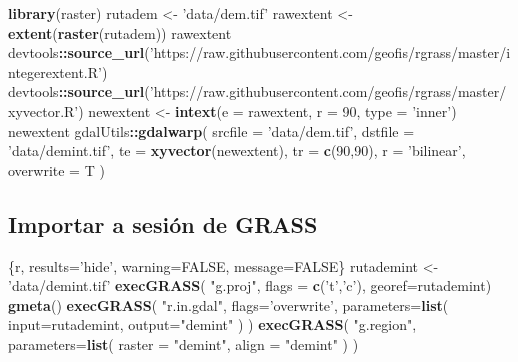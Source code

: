 \documentclass[11pt,]{article}
\newenvironment{Shaded}{\begin{snugshade}}{\end{snugshade}}
\newcommand{\KeywordTok}[1]{\textcolor[rgb]{0.13,0.29,0.53}{\textbf{#1}}}
\newcommand{\DataTypeTok}[1]{\textcolor[rgb]{0.13,0.29,0.53}{#1}}
\newcommand{\DecValTok}[1]{\textcolor[rgb]{0.00,0.00,0.81}{#1}}
\newcommand{\StringTok}[1]{\textcolor[rgb]{0.31,0.60,0.02}{#1}}
\newcommand{\OtherTok}[1]{\textcolor[rgb]{0.56,0.35,0.01}{#1}}
\newcommand{\OperatorTok}[1]{\textcolor[rgb]{0.81,0.36,0.00}{\textbf{#1}}}
\newcommand{\NormalTok}[1]{#1}
\begin{document}
\begin{Shaded}
\begin{Highlighting}[]
\KeywordTok{library}\NormalTok{(raster)}
\NormalTok{rutadem <-}\StringTok{ 'data/dem.tif'}
\NormalTok{rawextent <-}\StringTok{ }\KeywordTok{extent}\NormalTok{(}\KeywordTok{raster}\NormalTok{(rutadem))}
\NormalTok{rawextent}
\NormalTok{devtools}\OperatorTok{::}\KeywordTok{source_url}\NormalTok{(}\StringTok{'https://raw.githubusercontent.com/geofis/rgrass/master/integerextent.R'}\NormalTok{)}
\NormalTok{devtools}\OperatorTok{::}\KeywordTok{source_url}\NormalTok{(}\StringTok{'https://raw.githubusercontent.com/geofis/rgrass/master/xyvector.R'}\NormalTok{)}
\NormalTok{newextent <-}\StringTok{ }\KeywordTok{intext}\NormalTok{(}\DataTypeTok{e =}\NormalTok{ rawextent, }\DataTypeTok{r =} \DecValTok{90}\NormalTok{, }\DataTypeTok{type =} \StringTok{'inner'}\NormalTok{)}
\NormalTok{newextent}
\NormalTok{gdalUtils}\OperatorTok{::}\KeywordTok{gdalwarp}\NormalTok{(}
  \DataTypeTok{srcfile =} \StringTok{'data/dem.tif'}\NormalTok{,}
  \DataTypeTok{dstfile =} \StringTok{'data/demint.tif'}\NormalTok{,}
  \DataTypeTok{te =} \KeywordTok{xyvector}\NormalTok{(newextent),}
  \DataTypeTok{tr =} \KeywordTok{c}\NormalTok{(}\DecValTok{90}\NormalTok{,}\DecValTok{90}\NormalTok{),}
  \DataTypeTok{r =} \StringTok{'bilinear'}\NormalTok{,}
  \DataTypeTok{overwrite =}\NormalTok{ T}
\NormalTok{)}
\end{Highlighting}
\end{Shaded}

\subsection{Importar a sesión de
GRASS}\label{importar-a-sesiuxf3n-de-grass}

\begin{Shaded}
\begin{Highlighting}[]
\NormalTok{   \{r, results=}\StringTok{'hide'}\NormalTok{, warning=}\OtherTok{FALSE}\NormalTok{, message=}\OtherTok{FALSE}\NormalTok{\}}
\NormalTok{rutademint <-}\StringTok{ 'data/demint.tif'}
\KeywordTok{execGRASS}\NormalTok{(}
  \StringTok{"g.proj"}\NormalTok{,}
  \DataTypeTok{flags =} \KeywordTok{c}\NormalTok{(}\StringTok{'t'}\NormalTok{,}\StringTok{'c'}\NormalTok{),}
  \DataTypeTok{georef=}\NormalTok{rutademint)}
\KeywordTok{gmeta}\NormalTok{()}
\KeywordTok{execGRASS}\NormalTok{(}
  \StringTok{"r.in.gdal"}\NormalTok{,}
  \DataTypeTok{flags=}\StringTok{'overwrite'}\NormalTok{,}
  \DataTypeTok{parameters=}\KeywordTok{list}\NormalTok{(}
    \DataTypeTok{input=}\NormalTok{rutademint,}
    \DataTypeTok{output=}\StringTok{"demint"}
\NormalTok{  )}
\NormalTok{)}
\KeywordTok{execGRASS}\NormalTok{(}
  \StringTok{"g.region"}\NormalTok{,}
  \DataTypeTok{parameters=}\KeywordTok{list}\NormalTok{(}
    \DataTypeTok{raster =} \StringTok{"demint"}\NormalTok{,}
    \DataTypeTok{align =} \StringTok{"demint"}
\NormalTok{  )}
\NormalTok{)}
\end{Highlighting}
\end{Shaded}
\end{document}
